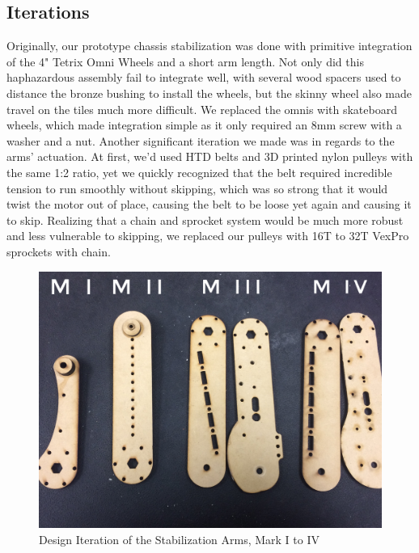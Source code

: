 \subsection*{Iterations}
Originally, our prototype chassis stabilization was done with primitive integration of the 4" Tetrix Omni Wheels and a short arm length. Not only did this haphazardous assembly fail to integrate well, with several wood spacers used to distance the bronze bushing to install the wheels, but the skinny wheel also made travel on the tiles much more difficult. We replaced the omnis with skateboard wheels, which made integration simple as it only required an 8mm screw with a washer and a nut. Another significant iteration we made was in regards to the arms' actuation. At first, we'd used HTD belts and 3D printed nylon pulleys with the same 1:2 ratio, yet we quickly recognized that the belt required incredible tension to run smoothly without skipping, which was so strong that it would twist the motor out of place, causing the belt to be loose yet again and causing it to skip. Realizing that a chain and sprocket system would be much more robust and less vulnerable to skipping, we replaced our pulleys with 16T to 32T VexPro sprockets with chain. 


\begin{figure}[h!]
\centering
\includegraphics[width=.8\linewidth]{Design_Overview/Iteration.jpg}
\caption{Design Iteration of the Stabilization Arms, Mark I to IV}
\label{fig:iteration}
\end{figure}

